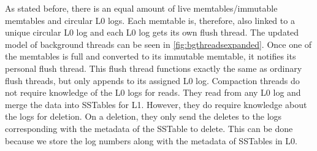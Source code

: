 As stated before, there is an equal amount of live memtables/immutable memtables and circular L0 logs. Each memtable is, therefore, also linked to a unique circular L0 log and each L0 log gets its own flush thread. The updated model of background threads can be seen in \autoref{fig:bgthreadsexpanded}. Once one of the memtables is full and converted to its immutable memtable, it notifies its personal flush thread. This flush thread functions exactly the same as ordinary flush threads, but only appends to its assigned L0 log. Compaction threads do not require knowledge of the L0 logs for reads. They read from any L0 log and merge the data into SSTables for L1. However, they do require knowledge about the logs for deletion. On a deletion, they only send the deletes to the logs corresponding with the metadata of the SSTable to delete. This can be done because we store the log numbers along with the metadata of SSTables in L0.

